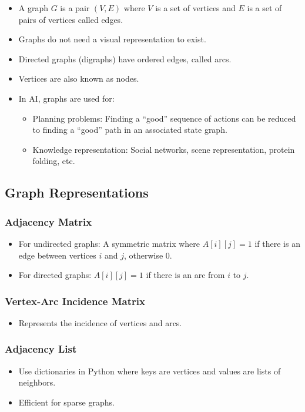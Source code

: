 \documentclass[8pt]{article}
\begin{document}
\begin{itemize}
    \item A graph \( G \) is a pair \( (V, E) \) where \( V \) is a set of vertices and \( E \) is a set of pairs of vertices called edges.
    \item Graphs do not need a visual representation to exist.
    \item Directed graphs (digraphs) have ordered edges, called arcs.
    \item Vertices are also known as nodes.
    \item In AI, graphs are used for:
    \begin{itemize}
        \item Planning problems: Finding a “good” sequence of actions can be reduced to finding a “good” path in an associated state graph.
        \item Knowledge representation: Social networks, scene representation, protein folding, etc.
    \end{itemize}
\end{itemize}

\subsection*{Graph Representations}
\subsubsection*{Adjacency Matrix}
\begin{itemize}
    \item For undirected graphs: A symmetric matrix where \( A[i][j] = 1 \) if there is an edge between vertices \( i \) and \( j \), otherwise \( 0 \).
    \item For directed graphs: \( A[i][j] = 1 \) if there is an arc from \( i \) to \( j \).
\end{itemize}

\subsubsection*{Vertex-Arc Incidence Matrix}
\begin{itemize}
    \item Represents the incidence of vertices and arcs.
\end{itemize}

\subsubsection*{Adjacency List}
\begin{itemize}
    \item Use dictionaries in Python where keys are vertices and values are lists of neighbors.
    \item Efficient for sparse graphs.
\end{itemize}
\end{document}
